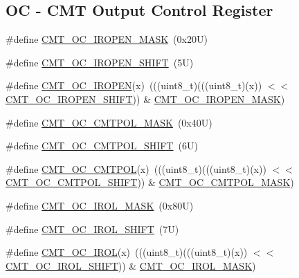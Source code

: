 \subsection*{OC -\/ C\+MT Output Control Register}
\begin{DoxyCompactItemize}
\item 
\#define \mbox{\hyperlink{group___c_m_t___register___masks_ga7f61dcc57756388d9e913eb3653c2e58}{C\+M\+T\+\_\+\+O\+C\+\_\+\+I\+R\+O\+P\+E\+N\+\_\+\+M\+A\+SK}}~(0x20\+U)
\item 
\#define \mbox{\hyperlink{group___c_m_t___register___masks_ga0d1d56279862ab5f549e82bd9c25b0f2}{C\+M\+T\+\_\+\+O\+C\+\_\+\+I\+R\+O\+P\+E\+N\+\_\+\+S\+H\+I\+FT}}~(5\+U)
\item 
\#define \mbox{\hyperlink{group___c_m_t___register___masks_gae2cbc01ba2aa26105f173ebfa58e199b}{C\+M\+T\+\_\+\+O\+C\+\_\+\+I\+R\+O\+P\+EN}}(x)~(((uint8\+\_\+t)(((uint8\+\_\+t)(x)) $<$$<$ \mbox{\hyperlink{group___c_m_t___register___masks_ga0d1d56279862ab5f549e82bd9c25b0f2}{C\+M\+T\+\_\+\+O\+C\+\_\+\+I\+R\+O\+P\+E\+N\+\_\+\+S\+H\+I\+FT}})) \& \mbox{\hyperlink{group___c_m_t___register___masks_ga7f61dcc57756388d9e913eb3653c2e58}{C\+M\+T\+\_\+\+O\+C\+\_\+\+I\+R\+O\+P\+E\+N\+\_\+\+M\+A\+SK}})
\item 
\#define \mbox{\hyperlink{group___c_m_t___register___masks_ga8096ee7b689f4a27e80c6d13f4097587}{C\+M\+T\+\_\+\+O\+C\+\_\+\+C\+M\+T\+P\+O\+L\+\_\+\+M\+A\+SK}}~(0x40\+U)
\item 
\#define \mbox{\hyperlink{group___c_m_t___register___masks_gaa20b0e3e0a6bc7db56b8c87f1fa24fb8}{C\+M\+T\+\_\+\+O\+C\+\_\+\+C\+M\+T\+P\+O\+L\+\_\+\+S\+H\+I\+FT}}~(6\+U)
\item 
\#define \mbox{\hyperlink{group___c_m_t___register___masks_gab100cae72fb9a9bc371593f115b4fd7e}{C\+M\+T\+\_\+\+O\+C\+\_\+\+C\+M\+T\+P\+OL}}(x)~(((uint8\+\_\+t)(((uint8\+\_\+t)(x)) $<$$<$ \mbox{\hyperlink{group___c_m_t___register___masks_gaa20b0e3e0a6bc7db56b8c87f1fa24fb8}{C\+M\+T\+\_\+\+O\+C\+\_\+\+C\+M\+T\+P\+O\+L\+\_\+\+S\+H\+I\+FT}})) \& \mbox{\hyperlink{group___c_m_t___register___masks_ga8096ee7b689f4a27e80c6d13f4097587}{C\+M\+T\+\_\+\+O\+C\+\_\+\+C\+M\+T\+P\+O\+L\+\_\+\+M\+A\+SK}})
\item 
\#define \mbox{\hyperlink{group___c_m_t___register___masks_gadb4b1905fcea060fccf7c4486db6908f}{C\+M\+T\+\_\+\+O\+C\+\_\+\+I\+R\+O\+L\+\_\+\+M\+A\+SK}}~(0x80\+U)
\item 
\#define \mbox{\hyperlink{group___c_m_t___register___masks_gae67f5985213b34945cc357cfde809125}{C\+M\+T\+\_\+\+O\+C\+\_\+\+I\+R\+O\+L\+\_\+\+S\+H\+I\+FT}}~(7\+U)
\item 
\#define \mbox{\hyperlink{group___c_m_t___register___masks_ga8a25012faeb43e492cb6677292111d9e}{C\+M\+T\+\_\+\+O\+C\+\_\+\+I\+R\+OL}}(x)~(((uint8\+\_\+t)(((uint8\+\_\+t)(x)) $<$$<$ \mbox{\hyperlink{group___c_m_t___register___masks_gae67f5985213b34945cc357cfde809125}{C\+M\+T\+\_\+\+O\+C\+\_\+\+I\+R\+O\+L\+\_\+\+S\+H\+I\+FT}})) \& \mbox{\hyperlink{group___c_m_t___register___masks_gadb4b1905fcea060fccf7c4486db6908f}{C\+M\+T\+\_\+\+O\+C\+\_\+\+I\+R\+O\+L\+\_\+\+M\+A\+SK}})
\end{DoxyCompactItemize}
